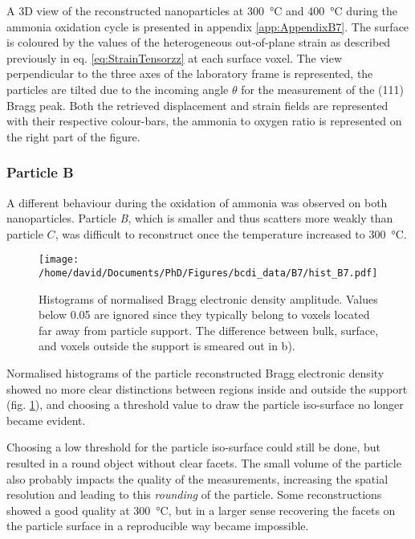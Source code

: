 A 3D view of the reconstructed nanoparticles at \qty{300}{\degreeCelsius} and \qty{400}{\degreeCelsius} during the ammonia oxidation cycle is presented in appendix \ref{app:AppendixB7}.
The surface is coloured by the values of the heterogeneous out-of-plane strain as described previously in eq. \ref{eq:StrainTensorzz} at each surface voxel.
The view perpendicular to the three axes of the laboratory frame is represented, the particles are tilted due to the incoming angle $\theta$ for the measurement of the (111) Bragg peak.
Both the retrieved displacement and strain fields are represented with their respective colour-bars, the ammonia to oxygen ratio is represented on the right part of the figure.

\subsubsection{Particle B}

A different behaviour during the oxidation of ammonia was observed on both nanoparticles.
Particle \textit{B}, which is smaller and thus scatters more weakly than particle $C$, was difficult to reconstruct once the temperature increased to \qty{300}{\degreeCelsius}.

\begin{figure}[!htb]
    \centering
    \texttt{[image: /home/david/Documents/PhD/Figures/bcdi\_data/B7/hist\_B7.pdf]}
    \caption{
        Histograms of normalised Bragg electronic density amplitude.
        Values below 0.05 are ignored since they typically belong to voxels located far away from particle support.
        The difference between bulk, surface, and voxels outside the support is smeared out in b).
    }
    \label{fig:B7Histo}
\end{figure}

Normalised histograms of the particle reconstructed Bragg electronic density showed no more clear distinctions between regions inside and outside the support (fig. \ref{fig:B7Histo}), and choosing a threshold value to draw the particle iso-surface no longer became evident.

Choosing a low threshold for the particle iso-surface could still be done, but resulted in a round object without clear facets.
The small volume of the particle also probably impacts the quality of the measurements, increasing the spatial resolution and leading to this \textit{rounding} of the particle.
Some reconstructions showed a good quality at \qty{300}{\degreeCelsius}, but in a larger sense recovering the facets on the particle surface in a reproducible way became impossible.


